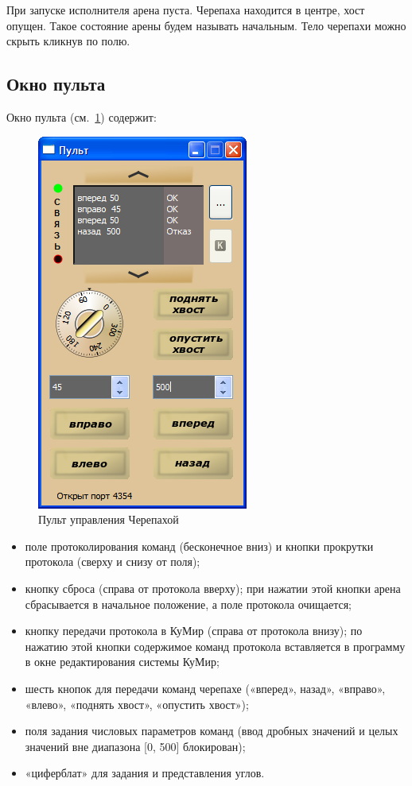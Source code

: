 При запуске исполнителя арена пуста. Черепаха находится в центре, хост опущен. Такое состояние арены будем называть начальным.
Тело черепахи можно скрыть кликнув по полю.

\subsection{Окно пульта}

Окно пульта (см.~\ref{tortPult}) содержит:
\begin{figure}[h]
	\begin{center}
		\includegraphics[scale=0.5]{tortpult.png}
	\end{center}
	\caption{Пульт управления Черепахой}
\label{tortPult}
\end{figure}

\begin{itemize}
\item поле протоколирования команд (бесконечное вниз) и кнопки прокрутки протокола (сверху и снизу от поля);
\item кнопку сброса (справа от протокола вверху); при нажатии этой кнопки арена сбрасывается в начальное положение, а поле протокола очищается;
\item кнопку передачи протокола в КуМир (справа от протокола внизу); по нажатию этой кнопки содержимое команд протокола вставляется в программу в окне редактирования системы КуМир; 
\item шесть кнопок для передачи команд черепахе («вперед», назад», «вправо», «влево», «поднять хвост», «опустить хвост»);
\item поля задания числовых параметров команд (ввод дробных значений и целых значений вне диапазона [0, 500] блокирован);
\item «циферблат» для задания и представления углов.
\end{itemize}


